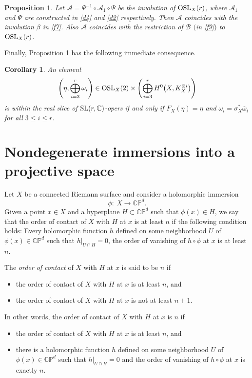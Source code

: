 \documentclass[pdftex]{sigma}
\numberwithin{equation}{section}
\newtheorem{Corollary}[Theorem]{Corollary}
\newtheorem{Proposition}[Theorem]{Proposition}
 { \theoremstyle{definition}
\newtheorem{Definition}[Theorem]{Definition}
\newtheorem{Note}[Theorem]{Note}
\newtheorem{Example}[Theorem]{Example}
\newtheorem{Remark}[Theorem]{Remark} }
\begin{document}
\begin{Proposition}\label{lem4}
Let ${\mathcal A} = \Psi^{-1}\circ{\mathcal A}_1\circ\Psi$ be the involution of
${\rm OSL}_X(r)$, where ${\mathcal A}_1$ and $\Psi$
are constructed in \eqref{d4} and \eqref{d2} respectively. Then ${\mathcal A}$ coincides
with the involution $\beta$ in \eqref{f7}. Also ${\mathcal A}$ coincides
with the restriction of $\mathcal B$ $($in \eqref{f9}$)$ to ${\rm OSL}_X(r)$.
\end{Proposition}

Finally, Proposition \ref{lem4} has the following immediate consequence.

\begin{Corollary}\label{corpr3}
An element
\[
\left(\eta, \bigoplus_{i=3}^r \omega_i\right) \in
{\rm OSL}_X(2)\times \left(\bigoplus_{i=3}^r H^0\bigl(X, K^{\otimes i}_X\bigr)\right)
\]
is within the real slice of ${\rm SL}(r,{\mathbb C})$-opers if and only if
$F_X(\eta) = \eta$ and $\omega_i = \sigma^*_X\overline{\omega}_i$ for all $3 \leq i \leq r$.
\end{Corollary}

\section{Nondegenerate immersions into a projective space}

Let $X$ be a connected Riemann surface and consider a holomorphic immersion
\[
\phi\colon\ X \longrightarrow {\mathbb C}{\mathbb P}^d.
\]
Given a point $x \in X$ and a hyperplane
$H \subset {\mathbb C}{\mathbb P}^d$ such that $\phi(x) \in H$,
we say that the order of contact of $X$ with $H$ at $x$ is at least $n$
if the following condition holds: Every holomorphic function $h$ defined on some
neighborhood $U$ of $\phi(x) \in {\mathbb C}{\mathbb P}^d$ such that
$h\big\vert_{U\cap H} = 0$, the order of vanishing of $h\circ\phi$ at
$x$ is at least $n$.

\begin{Definition}The {\it order of contact} of $X$ with $H$ at $x$ is said to
be $n$ if
\begin{itemize}\itemsep=0pt
\item the order of contact of $X$ with $H$ at $x$ is at least $n$, and

\item the order of contact of $X$ with $H$ at $x$ is not at least $n+1$.
\end{itemize}
\end{Definition}
In other words, the order of contact of $X$ with $H$ at $x$ is $n$ if
\begin{itemize}\itemsep=0pt
\item the order of contact of $X$ with $H$ at $x$ is at least $n$, and

\item there is a holomorphic function $h$ defined on some
neighborhood $U$ of $\phi(x) \in {\mathbb C}{\mathbb P}^d$ such that
$h\big\vert_{U\cap H} = 0$ and the order of vanishing of $h\circ\phi$ at
$x$ is exactly $n$.
\end{itemize}
\end{document}
